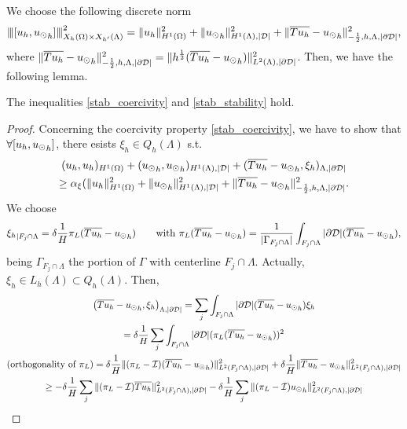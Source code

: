 We choose the following discrete norm
\begin{equation*}
{\left\vert\kern-0.25ex\left\vert\kern-0.25ex\left\vert [u_h, {u_{\odot}}_h] \right\vert\kern-0.25ex\right\vert\kern-0.25ex\right\vert}^2_{X_h(\Omega)\times X_{h'}(\Lambda) }
= \|u_h\|^2_{H^1(\Omega)}+\|{u_{\odot}}_h\|^2_{H^1(\Lambda),|\mathcal{D}|} + \|\overline{Tu_h} - {u_{\odot}}_h\|^2_{-\frac 12, h, \Lambda, |\partial\mathcal{D}|},
\end{equation*}
where $\|\overline{Tu_h} - {u_{\odot}}_h\|^2_{-\frac 12, h, \Lambda, |\partial\mathcal{D}|} = \|h^{\frac 12} (\overline{Tu_h} - {u_{\odot}}_h)\|^2_{L^2(\Lambda), |\partial\mathcal{D}|} $. Then, we have the following lemma. 
\begin{lemma}
The inequalities \eqref{stab_coercivity} and \eqref{stab_stability} hold.
\end{lemma}
\begin{proof} 
Concerning the coercivity property \eqref{stab_coercivity}, we have to show that $\forall [u_h, {u_{\odot}}_h]$, there esists $\xi_h \in Q_h(\Lambda)$ s.t.
\begin{multline*}
(u_h,u_h)_{H^1(\Omega)}+ ({u_{\odot}}_h, {u_{\odot}}_h)_{H^1(\Lambda), |\mathcal{D}|} +   (\overline{Tu_h} - {u_{\odot}}_h, \xi_h)_{\Lambda,|\partial\mathcal{D}|} \\
\geq \alpha_{\xi}(\|u_h\|^2_{H^1(\Omega)}+\|{u_{\odot}}_h\|^2_{H^1(\Lambda),|\mathcal{D}|}+ \|\overline{Tu_h} - {u_{\odot}}_h\|^2_{-\frac 12, h, \Lambda, |\partial\mathcal{D}|}.
\end{multline*}
We choose 
\begin{equation*}
{\xi_h}_{|F_j\cap \Lambda}=\delta \frac 1H \pi_L(\overline{Tu_h}-{u_{\odot}}_h) \qquad \text{with } \pi_L(\overline{Tu_h}-{u_{\odot}}_h) =\frac{1}{|\Gamma_{F_j\cap \Lambda}|}\int_{F_j\cap \Lambda}|\partial\mathcal{D}| (\overline{Tu_h}- {u_{\odot}}_h),
\end{equation*}
being $\Gamma_{F_j\cap \Lambda}$ the portion of $\Gamma$ with centerline $F_j\cap \Lambda$. 
Actually, $\xi_h\in L_h(\Lambda) \subset Q_h(\Lambda)$. Then,
\begin{multline*}
\left( \avrc{Tu_h} - {\ud}_h, \xi _h \right)_{\Lambda,|\DD|} 
= \sum_j \int_{F_j\cap \Lambda} |\DD|( \avrc{Tu_h} - {\ud}_h)\xi_h
\\
= \delta \frac{1}{H} \sum_j \int_{F_j\cap \Lambda}|\DD| (\pi_L( \avrc{Tu_h} - {\ud}_h) )^2
\\
(\text{orthogonality of $\pi_L$}) =  \delta \frac{1}{H} \|(\pi_L-\mathcal{I})(\avrc{Tu_h} - {\ud}_h)\|^2_{L^2(F_j\cap \Lambda),|\DD|} + \delta \frac{1}{H} \|\avrc{Tu_h} - {\ud}_h\|^2_{L^2(F_j\cap \Lambda),|\DD|}
\\ 
\geq -\delta \frac 1H \sum_j \|(\pi_L - \mathcal{I})\avrc{Tu_h}\|^2_{L^2(F_j\cap \Lambda), |\DD|}
- \delta \frac 1H \sum_j \|(\pi_L - \mathcal{I}){\ud}_h\|^2_{L^2(F_j\cap \Lambda),|\DD|}

\end{multline*}
\end{proof}
